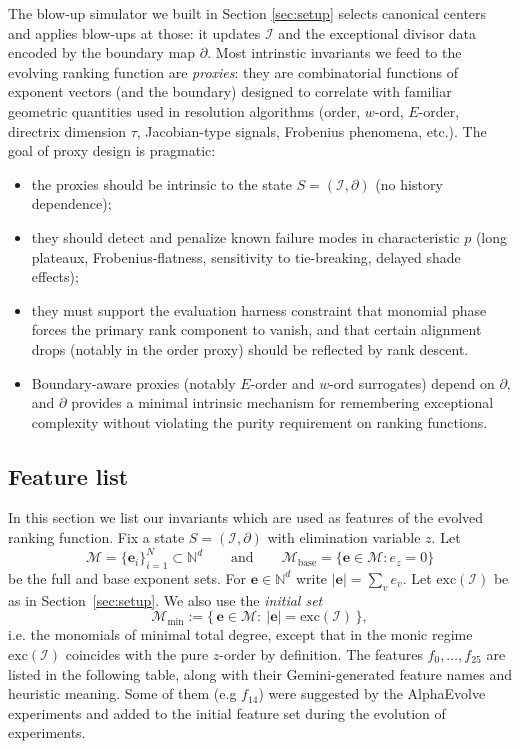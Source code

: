 \documentclass[11pt]{amsart}
\begin{document}
The blow-up simulator we built in  Section \ref{sec:setup} selects canonical centers and applies blow-ups at those: it updates $\mathcal{I}$ and the exceptional divisor data encoded by the boundary map $\partial$.
Most intrinstic invariants we feed to the evolving ranking function are \emph{proxies}:
they are combinatorial functions of exponent vectors (and the boundary) designed to correlate with familiar
geometric quantities used in resolution algorithms (order, $w$-ord, $E$-order, directrix dimension $\tau$,
Jacobian-type signals, Frobenius phenomena, etc.).
The goal of proxy design is pragmatic:
\begin{itemize}
\item the proxies should be intrinsic to the state $S=(\mathcal I,\partial)$ (no history dependence);
\item they should detect and penalize known failure modes in characteristic $p$ (long plateaux, Frobenius-flatness,
      sensitivity to tie-breaking, delayed shade effects);
\item they must support the evaluation harness constraint that monomial phase forces the primary rank
      component to vanish, and that certain alignment drops (notably in the order proxy) should be reflected by rank descent.
\item Boundary-aware proxies (notably $E$-order and $w$-ord surrogates) depend on $\partial$, and $\partial$ provides
a minimal intrinsic mechanism for remembering exceptional complexity without violating the purity requirement
on ranking functions.
\end{itemize}

\subsection{Feature list}\label{subsec:features} In this section we list our invariants which are used as features of the evolved ranking function.  
Fix a state $S=(\mathcal I,\partial)$ with elimination variable $z$.
Let
\[
\mathcal M=\{\mathbf{e}_i\}_{i=1}^N\subset\mathbb{N}^d
\qquad\text{and}\qquad
\mathcal{M}_{\mathrm{base}}=\{\mathbf{e}\in\mathcal M: e_z=0\}
\]
be the full and base exponent sets. For $\mathbf{e}\in\mathbb{N}^d$ write $|\mathbf{e}|=\sum_v e_v$.
Let $\mathrm{exc}(\mathcal I)$ be as in Section~\ref{sec:setup}.
We also use the \emph{initial set}
\[
\mathcal{M}_{\min}:=\{\,\mathbf{e}\in\mathcal{M}:\ |\mathbf{e}|=\mathrm{exc}(\mathcal I)\,\},
\]
i.e. the monomials of minimal total degree, except that in the monic regime $\mathrm{exc}(\mathcal{I})$ coincides with
the pure $z$-order by definition.
The features $f_0,\dots,f_{25}$ are listed in the following table, along with their Gemini-generated feature names and heuristic meaning. Some of them (e.g $f_{14}$) were suggested by the AlphaEvolve experiments and added to the initial feature set during the evolution of experiments. 
\end{document}
